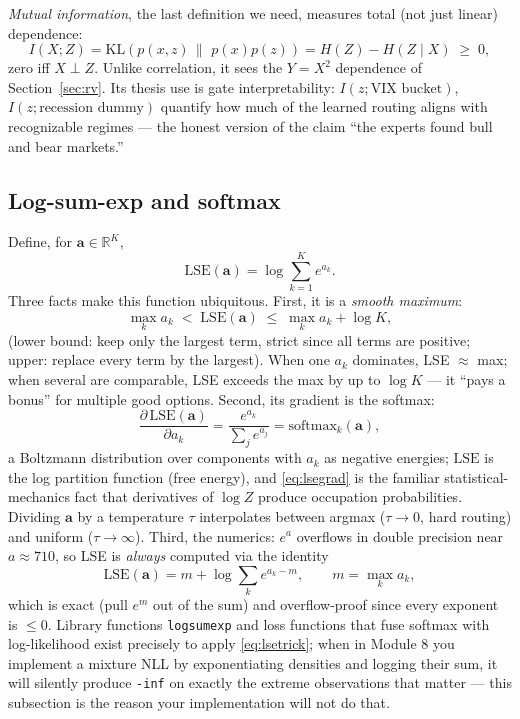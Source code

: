 \documentclass[11pt]{article}
\numberwithin{equation}{section}
\theoremstyle{plain}
\theoremstyle{definition}
\theoremstyle{remark}
\newcommand{\KL}[2]{\mathrm{KL}\!\left(#1 \,\middle\|\, #2\right)}
\newcommand{\R}{\mathbb{R}}
\begin{document}
\emph{Mutual information}, the last definition we need, measures total (not just linear) dependence:
\begin{equation}
I(X; Z) = \KL{p(x,z)}{\,p(x)p(z)} = H(Z) - H(Z \mid X) \;\ge\; 0,
\end{equation}
zero iff $X \perp Z$. Unlike correlation, it sees the $Y = X^2$ dependence of Section~\ref{sec:rv}. Its thesis use is gate interpretability: $I(z; \text{VIX bucket})$, $I(z; \text{recession dummy})$ quantify how much of the learned routing aligns with recognizable regimes --- the honest version of the claim ``the experts found bull and bear markets.''

\subsection{Log-sum-exp and softmax}\label{sec:lse}

Define, for $\bm{a} \in \R^K$,
\begin{equation}
\mathrm{LSE}(\bm{a}) = \log \sum_{k=1}^K e^{a_k} .
\end{equation}
Three facts make this function ubiquitous. First, it is a \emph{smooth maximum}:
\begin{equation}
\max_k a_k \;<\; \mathrm{LSE}(\bm{a}) \;\le\; \max_k a_k + \log K,
\label{eq:lsebounds}
\end{equation}
(lower bound: keep only the largest term, strict since all terms are positive; upper: replace every term by the largest). When one $a_k$ dominates, LSE $\approx$ max; when several are comparable, LSE exceeds the max by up to $\log K$ --- it ``pays a bonus'' for multiple good options. Second, its gradient is the softmax:
\begin{equation}
\frac{\partial\, \mathrm{LSE}(\bm{a})}{\partial a_k}
= \frac{e^{a_k}}{\sum_j e^{a_j}}
= \mathrm{softmax}_k(\bm{a}),
\label{eq:lsegrad}
\end{equation}
a Boltzmann distribution over components with $a_k$ as negative energies; $\mathrm{LSE}$ is the log partition function (free energy), and \eqref{eq:lsegrad} is the familiar statistical-mechanics fact that derivatives of $\log Z$ produce occupation probabilities. Dividing $\bm a$ by a temperature $\tau$ interpolates between argmax ($\tau \to 0$, hard routing) and uniform ($\tau \to \infty$). Third, the numerics: $e^{a}$ overflows in double precision near $a \approx 710$, so LSE is \emph{always} computed via the identity
\begin{equation}
\mathrm{LSE}(\bm{a}) = m + \log \sum_k e^{a_k - m}, \qquad m = \max_k a_k,
\label{eq:lsetrick}
\end{equation}
which is exact (pull $e^m$ out of the sum) and overflow-proof since every exponent is $\le 0$. Library functions \texttt{logsumexp} and loss functions that fuse softmax with log-likelihood exist precisely to apply \eqref{eq:lsetrick}; when in Module 8 you implement a mixture NLL by exponentiating densities and logging their sum, it will silently produce \texttt{-inf} on exactly the extreme observations that matter --- this subsection is the reason your implementation will not do that.
\end{document}
